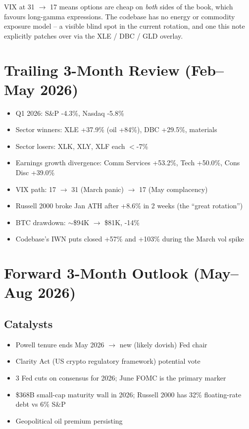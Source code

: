 \documentclass[11pt,letterpaper]{article}
\begin{document}
VIX at 31 $\to$ 17 means options are cheap on \emph{both} sides of the
book, which favours long-gamma expressions. The codebase has no
energy or commodity exposure model -- a visible blind spot in the
current rotation, and one this note explicitly patches over via the
XLE / DBC / GLD overlay.

\section{Trailing 3-Month Review (Feb--May 2026)}

\begin{itemize}[nosep]
  \item Q1 2026: S\&P -4.3\%, Nasdaq -5.8\%
  \item Sector winners: \textcolor{gain}{XLE +37.9\%} (oil +84\%),
        \textcolor{gain}{DBC +29.5\%}, materials
  \item Sector losers: XLK, XLY, XLF each \textcolor{loss}{$<$-7\%}
  \item Earnings growth divergence: Comm Services +53.2\%, Tech +50.0\%,
        Cons Disc +39.0\%
  \item VIX path: 17 $\to$ 31 (March panic) $\to$ 17 (May complacency)
  \item Russell 2000 broke Jan ATH after \textcolor{gain}{+8.6\%} in
        2 weeks (the ``great rotation'')
  \item BTC drawdown: $\sim$\$94K $\to$ \$81K, \textcolor{loss}{-14\%}
  \item Codebase's IWN puts closed +57\% and +103\% during the March
        vol spike
\end{itemize}

\section{Forward 3-Month Outlook (May--Aug 2026)}

\subsection{Catalysts}
\begin{itemize}[nosep]
  \item Powell tenure ends May 2026 $\to$ new (likely dovish) Fed chair
  \item Clarity Act (US crypto regulatory framework) potential vote
  \item 3 Fed cuts on consensus for 2026; June FOMC is the primary marker
  \item \$368B small-cap maturity wall in 2026; Russell 2000 has 32\%
        floating-rate debt vs 6\% S\&P
  \item Geopolitical oil premium persisting
\end{itemize}
\end{document}
